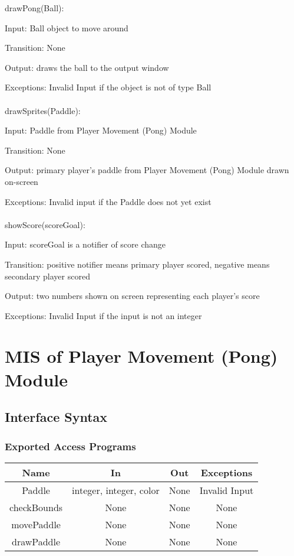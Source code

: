 \documentclass[12pt, titlepage]{article}
\begin{document}
		drawPong(Ball):
		
		Input: Ball object to move around
		
		Transition: None
		
		Output: draws the ball to the output window
		
		Exceptions: Invalid Input if the object is not of type Ball\\
		\\
		drawSprites(Paddle):
		
		Input: Paddle from Player Movement (Pong) Module
		
		Transition: None
		
		Output: primary player's paddle from Player Movement (Pong) Module drawn on-screen
		
		Exceptions: Invalid input if the Paddle does not yet exist\\
		\\
		showScore(scoreGoal):
		
		Input: scoreGoal is a notifier of score change
		
		Transition: positive notifier means primary player scored, negative means secondary player scored
		
		Output: two numbers shown on screen representing each player's score
		
		Exceptions: Invalid Input if the input is not an integer
		
\section{MIS of Player Movement (Pong) Module}
		\subsection{Interface Syntax}
		\subsubsection{Exported Access Programs}
		\begin{tabular}[pos]{|c|c|c|c|}
			\hline
			\textbf{Name}& \textbf{In} & \textbf{Out} & \textbf{Exceptions} \\ \hline
			Paddle & integer, integer, color & None & Invalid Input \\ \hline
			checkBounds & None & None & None \\ \hline
			movePaddle & None & None & None \\ \hline
			drawPaddle & None & None & None \\ \hline
		\end{tabular}
		
\end{document}
